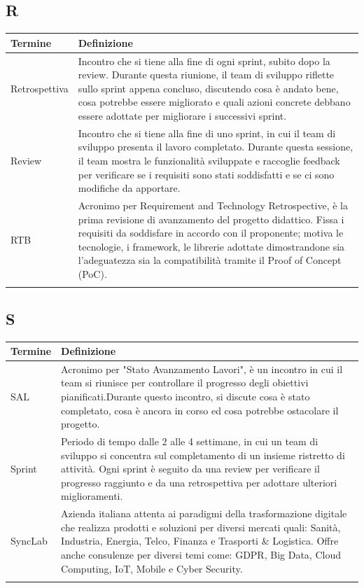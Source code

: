 \documentclass[10pt]{article}
\begin{document}
\subsection{R} %
\begin{tabularx}{\textwidth}{|>{\centering\arraybackslash}l|X|}
\hline
\rowcolor[gray]{0.8}
\textbf{Termine} & \textbf{Definizione}\\
\hline
Retrospettiva & Incontro che si tiene alla fine di ogni sprint, subito dopo la review. Durante questa riunione, il team di sviluppo riflette sullo sprint appena concluso, discutendo cosa è andato bene, cosa potrebbe essere migliorato e quali azioni concrete debbano essere adottate per migliorare i successivi sprint.\\
\hline
Review & Incontro che si tiene alla fine di uno sprint, in cui il team di sviluppo presenta il lavoro completato. Durante questa sessione, il team mostra le funzionalità sviluppate e raccoglie feedback per verificare se i requisiti sono stati soddisfatti e se ci sono modifiche da apportare.\\
\hline
RTB & Acronimo per Requirement and Technology Retrospective, è la prima revisione di avanzamento del progetto didattico. Fissa i requisiti da soddisfare in accordo con il proponente; motiva le tecnologie, i framework, le librerie adottate dimostrandone sia l'adeguatezza sia la compatibilità tramite il Proof of Concept (PoC).\\
\hline
& \\
\hline
\end{tabularx}

\subsection{S} %
\begin{tabularx}{\textwidth}{|>{\centering\arraybackslash}l|X|}
\hline
\rowcolor[gray]{0.8}
\textbf{Termine} & \textbf{Definizione}\\
\hline
SAL & Acronimo per "Stato Avanzamento Lavori", è un incontro in cui il team si riunisce per controllare il progresso degli obiettivi pianificati.\newline Durante questo incontro, si discute cosa è stato completato, cosa è ancora in corso ed cosa potrebbe ostacolare il progetto.\\
\hline
Sprint & Periodo di tempo dalle 2 alle 4 settimane, in cui un team di sviluppo si concentra sul completamento di un insieme ristretto di attività. Ogni sprint è seguito da una review per verificare il progresso raggiunto e da una retrospettiva per adottare ulteriori miglioramenti.\\
\hline
SyncLab & Azienda italiana attenta ai paradigmi della trasformazione digitale che realizza prodotti e soluzioni per diversi mercati quali: Sanità, Industria, Energia, Telco, Finanza e Trasporti \& Logistica. Offre anche consulenze per diversi temi come: GDPR, Big Data, Cloud Computing, IoT, Mobile e Cyber Security.\\
\hline
 & \\
\hline
\end{tabularx}
\end{document}
